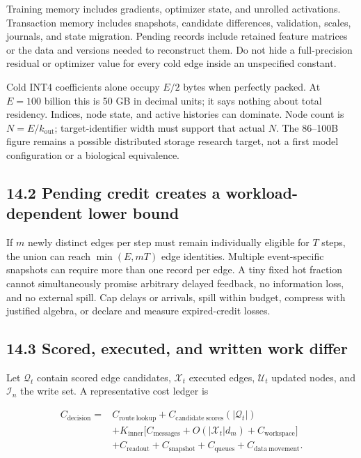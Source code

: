 \documentclass[
  11pt,
  a4paper,
]{article}
\begin{document}
Training memory includes gradients, optimizer state, and unrolled
activations. Transaction memory includes snapshots, candidate
differences, validation, scales, journals, and state migration. Pending
records include retained feature matrices or the data and versions
needed to reconstruct them. Do not hide a full-precision residual or
optimizer value for every cold edge inside an unspecified constant.

Cold INT4 coefficients alone occupy \(E/2\) bytes when perfectly packed.
At \(E=100\) billion this is 50 GB in decimal units; it says nothing
about total residency. Indices, node state, and active histories can
dominate. Node count is \(N=E/k_{\mathrm{out}}\); target-identifier
width must support that actual \(N\). The 86--100B figure remains a
possible distributed storage research target, not a first model
configuration or a biological equivalence.

\subsection{14.2 Pending credit creates a workload-dependent lower
bound}\label{pending-credit-creates-a-workload-dependent-lower-bound}

If \(m\) newly distinct edges per step must remain individually eligible
for \(T\) steps, the union can reach \(\min(E,mT)\) edge identities.
Multiple event-specific snapshots can require more than one record per
edge. A tiny fixed hot fraction cannot simultaneously promise arbitrary
delayed feedback, no information loss, and no external spill. Cap delays
or arrivals, spill within budget, compress with justified algebra, or
declare and measure expired-credit losses.

\subsection{14.3 Scored, executed, and written work
differ}\label{scored-executed-and-written-work-differ}

Let \(\mathcal Q_t\) contain scored edge candidates, \(\mathcal X_t\)
executed edges, \(\mathcal U_t\) updated nodes, and \(\mathcal I_n\) the
write set. A representative cost ledger is

\[
\begin{aligned}
C_{\mathrm{decision}}={}&C_{\mathrm{route\ lookup}}+C_{\mathrm{candidate\ scores}}(|\mathcal Q_t|)\\
&+K_{\mathrm{inner}}\big[
C_{\mathrm{messages}}+O(|\mathcal X_t|d_m)+C_{\mathrm{workspace}}\big]\\
&+C_{\mathrm{readout}}+C_{\mathrm{snapshot}}+C_{\mathrm{queues}}+C_{\mathrm{data\ movement}}.
\end{aligned}
\tag{36}
\]
\end{document}
